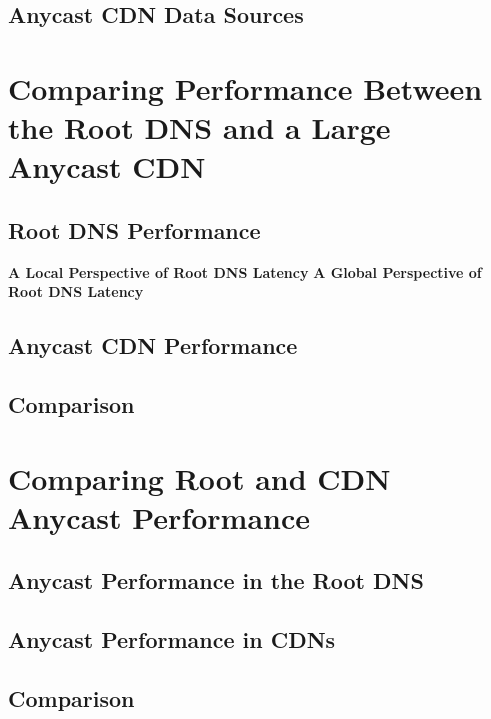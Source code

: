 \documentclass[sigconf,letterpaper,nonacm,10pt,anonymous]{acmart}
\begin{document}
\subsection{Anycast CDN Data Sources}\label{anycast-cdn-data-sources}

\section{Comparing Performance Between the Root DNS and a Large Anycast
CDN}\label{comparing-performance-between-the-root-dns-and-a-large-anycast-cdn}

\subsection{Root DNS Performance}\label{root-dns-performance}

\textbf{A Local Perspective of Root DNS Latency}
\textbf{A Global Perspective of Root DNS Latency}

\subsection{Anycast CDN Performance}\label{anycast-cdn-performance}

\subsection{Comparison}\label{comparison}

\section{Comparing Root and CDN Anycast
Performance}\label{comparing-root-and-cdn-anycast-performance}

\subsection{Anycast Performance in the Root
DNS}\label{anycast-performance-in-the-root-dns}

\subsection{Anycast Performance in
CDNs}\label{anycast-performance-in-cdns}

\subsection{Comparison}\label{comparison-1}
\end{document}
